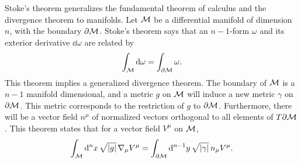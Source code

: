 Stoke's theorem generalizes the fundamental theorem of calculus and the divergence theorem to manifolds.
Let $\mathcal M$ be a differential manifold of dimension $n$, with the boundary $\partial \mathcal M$.
Stoke's theorem says that an $n-1$-form $\omega$ and its exterior derivative $\dd \omega$ are related by
%
\begin{equation}
    \int_\mathcal M \mathrm{d} \omega = \int_{\partial \mathcal M}  \omega. 
\end{equation}
%
This theorem implies a generalized divergence theorem.
The boundary of $\mathcal M$ is a $n-1$ manifold dimensional, and a metric $g$ on $\mathcal M$ will induce a new metric $\gamma$ on $\partial \mathcal M$.
This metric corresponds to the restriction of $g$ to $\partial \mathcal M$.
Furthermore, there will be a vector field $n^\mu$ of normalized vectors orthogonal to all elements of $T \partial \mathcal M$.
This theorem states that for a vector field $V^\mu$ on $\mathcal M$,
%
\begin{equation}
    \label{generalized divergence theorem}
    \int_\mathcal M \mathrm{d}^n x \, \sqrt{|g|} \,  \nabla_\mu V^\mu 
    = \int_{\partial \mathcal M} \mathrm{d}^{n-1}y \, \sqrt{|\gamma|} \, n_\mu V^\mu.
\end{equation}

